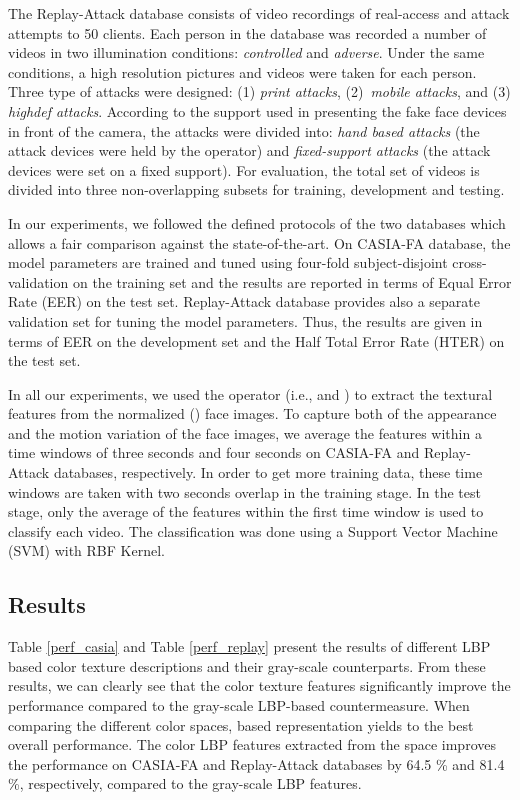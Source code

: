 \documentclass{article}
\begin{document}
The Replay-Attack database \cite{replay} consists of video recordings of  real-access and attack attempts to 50 clients. Each person in the database was recorded a number of videos in two illumination conditions: \textit{controlled} and \textit{adverse}. Under the same conditions, a high resolution pictures and videos were taken for each person. Three type of attacks were designed: (1) \textit{print attacks}, (2)~\textit{mobile attacks}, and (3) \textit{highdef attacks}. According to the support used in presenting the fake face devices in front of the camera, the attacks were divided into: \textit{hand based attacks} (the attack devices were held by the operator) and \textit{fixed-support attacks} (the attack devices were set on a fixed support). For evaluation, the total set of videos is divided into three non-overlapping subsets for training, development and testing.  

In our experiments, we followed the defined protocols of the two databases which allows a fair comparison against the state-of-the-art. On CASIA-FA database, the model parameters are trained and tuned using four-fold subject-disjoint cross-validation on the training set and the results are reported in terms of Equal Error Rate (EER) on the test set. Replay-Attack database provides also a separate validation set for tuning the model parameters. Thus, the results are given in terms of EER on the development set and the Half Total Error Rate (HTER) on the test set.

In all our experiments, we used the  operator (i.e.,  and ) to extract the textural features from the normalized ()  face images.
To capture both of the appearance and the motion variation of the face images, we average the features within a time windows of three seconds and four seconds on CASIA-FA and Replay-Attack databases, respectively. In order to get more training data, these time windows are taken with  two seconds overlap in the training stage. In the test stage, only the average of the features within the first time window is used to classify each video. The classification was done using a Support Vector Machine \cite{libsvm} (SVM) with RBF Kernel. 
		\vspace{-1mm}
\subsection{Results}
	\vspace{-1mm}
\label{sec:experiments}
 Table \ref{perf_casia} and Table \ref{perf_replay} present the results of different LBP based color texture descriptions and their gray-scale counterparts. From these results, we can clearly see that the color texture features significantly improve the performance compared to the gray-scale LBP-based countermeasure. When comparing the different color spaces,  based representation yields to the best overall performance. The color LBP features extracted from the  space improves the performance on CASIA-FA and Replay-Attack databases by 64.5 \% and 81.4 \%, respectively, compared to the gray-scale LBP features.
			
\end{document}
